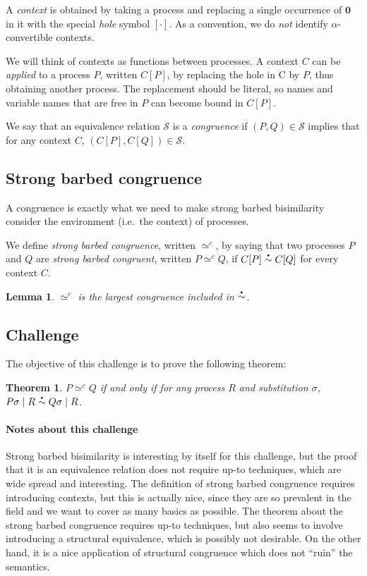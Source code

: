 \documentclass[a4paper]{article}
\newtheorem{lemma}{Lemma}
\newtheorem{theorem}{Theorem}
\newcommand{\Pend}{\bm{0}}
\newcommand{\Ppar}[2]{#1 \mid #2}
\newcommand\sbullet[1][.5]{\mathbin{\hbox{\scalebox{#1}{$\bullet$}}}}
\newcommand{\sbbisim}[2]{#1 \overset{\sbullet}{\sim} #2}
\newcommand{\ctxhole}{[\cdot]}
\newcommand{\applyctx}[2]{#1[#2]}
\newcommand{\sbcong}[2]{#1 \simeq^c #2}
\newcommand{\applysubst}[2]{#2#1}
\begin{document}
A \emph{context} is obtained by taking a process and replacing a single occurrence of \( \Pend \) in it with the special \emph{hole} symbol \( \ctxhole \).
As a convention, we do \emph{not} identify \( \alpha \)-convertible contexts.

We will think of contexts as functions between processes.
A context \( C \) can be \emph{applied} to a process \( P \), written \( \applyctx{C}{P} \), by replacing the hole in C by \( P \), thus obtaining another process.
The replacement should be literal, so names and variable names that are free in \( P \) can become bound in \( \applyctx{C}{P} \).

We say that an equivalence relation \( \mathcal{S} \) is a \emph{congruence} if \( (P,Q) \in \mathcal{S} \) implies that for any context \( C \), \( (\applyctx{C}{P}, \applyctx{C}{Q}) \in \mathcal{S} \).

\subsection{Strong barbed congruence}
A congruence is exactly what we need to make strong barbed bisimilarity consider the environment (i.e.\ the context) of processes.

We define \emph{strong barbed congruence}, written \( \sbcong{}{} \), by saying that two processes \( P \) and \( Q \) are \emph{strong barbed congruent}, written \( \sbcong{P}{Q} \), if \( \sbbisim{\applyctx{C}{P}}{\applyctx{C}{Q}} \) for every context \( C \).

\begin{lemma}
  \( \sbcong{}{} \) is the largest congruence included in \( \sbbisim{}{} \).
\end{lemma}

\subsection{Challenge}
The objective of this challenge is to prove the following theorem:
\begin{theorem}
  \( \sbcong{P}{Q} \) if and only if for any process \( R \) and substitution \( \sigma \), \( \sbbisim{\Ppar{\applysubst{\sigma}{P}}{R}}{\Ppar{\applysubst{\sigma}{Q}}{R}} \).
\end{theorem}

\paragraph{Notes about this challenge}
Strong barbed bisimilarity is interesting by itself for this challenge, but the proof that it is an equivalence relation does not require up-to techniques, which are wide spread and interesting.
The definition of strong barbed congruence requires introducing contexts, but this is actually nice, since they are so prevalent in the field and we want to cover as many basics as possible.
The theorem about the strong barbed congruence requires up-to techniques, but also seems to involve introducing a structural equivalence, which is possibly not desirable.
On the other hand, it is a nice application of structural congruence which does not ``ruin'' the semantics.
\end{document}
